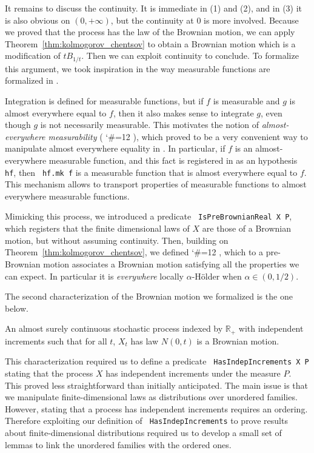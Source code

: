 \documentclass[lean]{Draft}
\makeatletter
\renewcommand{\lean}[1]{\lstinline| #1|}
\newcommand\leanlink{\begingroup\catcode`\#=12\relax\@leanlink}
\newcommand\@leanlink[2]{\endgroup
\href{#1}
{\texttt{\detokenize{#2}}}}
\newcommand{\mllink}[3]{%
\leanlink{https://github.com/leanprover-community/mathlib4/blob/6135ffb78e8bcd3fcc8ec02f3f82ea0b0737358b/Mathlib/#1.lean\##2}
{#3}}
\newcommand{\bmlink}[3]{%
\leanlink{https://github.com/RemyDegenne/brownian-motion/blob/8fd8dc52830cdd07cf9cc8eadd533e284425fa6f/BrownianMotion/#1.lean\##2}
{#3}}
\makeatother
\begin{document}
It remains to discuss the continuity. It is immediate in (1) and (2), and in (3) it is also obvious on $(0, +\infty)$, but the continuity at $0$ is more involved. Because we proved that the process has the law of the Brownian motion, we can apply Theorem~\ref{thm:kolmogorov_chentsov} to obtain a Brownian motion which is a modification of $t B_{1/t}$. Then we can exploit continuity to conclude. To formalize this argument, we took inspiration in the way measurable functions are formalized in \Lean.

Integration is defined for measurable functions, but if $f$ is measurable and $g$ is almost everywhere equal to $f$, then it also makes sense to integrate $g$, even though $g$ is not necessarily measurable. This motivates the notion of \emph{almost-everywhere measurability} (\mllink{MeasureTheory/Measure/MeasureSpaceDef}{L406-L413}{AEMeasurable}), which proved to be a very convenient way to manipulate almost everywhere equality in \Lean. In particular, if $f$ is an almost-everywhere measurable function, and this fact is registered in \Lean as an hypothesis \lean{hf}, then \lean{hf.mk f} is a measurable function that is almost everywhere equal to $f$. This mechanism allows to transport properties of measurable functions to almost everywhere measurable functions.

Mimicking this process, we introduced a predicate \lean{IsPreBrownianReal X P}, which registers that the finite dimensional laws of $X$ are those of a Brownian motion, but without assuming continuity. Then, building on Theorem~\ref{thm:kolmogorov_chentsov}, we defined \bmlink{Gaussian/BrownianMotion}{L103-L105}{IsPreBrownianReal.mk}, which to a pre-Brownian motion associates a Brownian motion satisfying all the properties we can expect. In particular it is \emph{everywhere} locally $\alpha$-Hölder when $\alpha \in (0, 1/2)$.

The second characterization of the Brownian motion we formalized is the one below.

\begin{proposition}[\mllink{Probability/BrownianMotion/Basic}{L186-L190}{HasIndepIncrements.isPreBrownianReal_of_hasLaw}]\label{prop:isBrownianOfIndep}
An almost surely continuous stochastic process indexed by $\mathbb{R}_+$ with independent increments such that for all $t$, $X_t$ has law $N(0,t)$ is a Brownian motion.
\end{proposition}

This characterization required us to define a predicate \lean{HasIndepIncrements X P} stating that the process $X$ has independent increments under the measure $P$.
This proved less straightforward than initially anticipated.
The main issue is that we manipulate finite-dimensional laws as distributions over unordered families. However, stating that a process has independent increments requires an ordering. Therefore exploiting our definition of \lean{HasIndepIncrements} to prove results about finite-dimensional distributions required us to develop a small set of lemmas to link the unordered families with the ordered ones.
\end{document}
